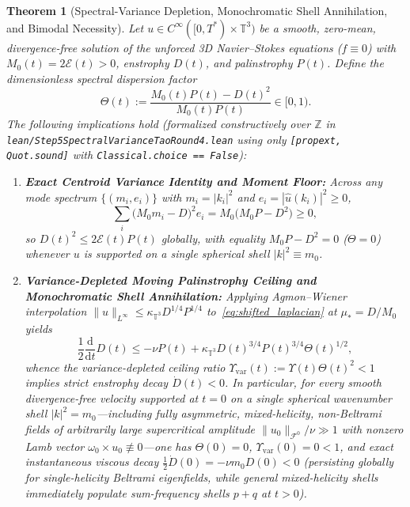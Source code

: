 \documentclass[11pt]{article}
\theoremstyle{plain}
\newtheorem{theorem}{Theorem}[section]
\theoremstyle{definition}
\begin{document}
\begin{theorem}[Spectral-Variance Depletion, Monochromatic Shell Annihilation, and Bimodal Necessity]\label{thm:step5}
Let $u \in C^\infty([0,T^*) \times \mathbb{T}^3)$ be a smooth, zero-mean, divergence-free solution of the unforced 3D Navier--Stokes equations ($f \equiv 0$) with $M_0(t) = 2\mathcal{E}(t) > 0$, enstrophy $D(t)$, and palinstrophy $P(t)$. Define the dimensionless spectral dispersion factor
\begin{equation}\label{eq:theta_var}
  \Theta(t) := \frac{M_0(t) P(t) - D(t)^2}{M_0(t) P(t)} \in [0, 1).
\end{equation}
The following implications hold (formalized constructively over $\mathbb{Z}$ in \texttt{lean/\allowbreak Step5Spectral\allowbreak VarianceTaoRound4.lean} using only \texttt{[propext, Quot.sound]} with \texttt{Classical.choice == False}):
\begin{enumerate}
  \item \textbf{Exact Centroid Variance Identity and Moment Floor:} Across any mode spectrum $\{(m_i, e_i)\}$ with $m_i = |k_i|^2$ and $e_i = |\hat{u}(k_i)|^2 \ge 0$,
  \begin{equation}\label{eq:centroid_variance}
    \sum_{i} \bigl(M_0 m_i - D\bigr)^2 e_i = M_0 \bigl(M_0 P - D^2\bigr) \ge 0,
  \end{equation}
  so $D(t)^2 \le 2\mathcal{E}(t) P(t)$ globally, with equality $M_0 P - D^2 = 0$ ($\Theta = 0$) whenever $u$ is supported on a single spherical shell $|k|^2 \equiv m_0$.
  \item \textbf{Variance-Depleted Moving Palinstrophy Ceiling and Monochromatic Shell Annihilation:} Applying Agmon--Wiener interpolation $\|u\|_{L^\infty} \le \kappa_{\mathbb{T}^3} D^{1/4} P^{1/4}$ to~\eqref{eq:shifted_laplacian} at $\mu_* = D/M_0$ yields
  \begin{equation}\label{eq:variance_ceiling}
    \frac{1}{2}\frac{\mathrm{d}}{\mathrm{d}t} D(t) \le -\nu P(t) + \kappa_{\mathbb{T}^3} D(t)^{3/4} P(t)^{3/4} \Theta(t)^{1/2},
  \end{equation}
  whence the variance-depleted ceiling ratio $\Upsilon_{\mathrm{var}}(t) := \Upsilon(t) \Theta(t)^2 < 1$ implies strict enstrophy decay $\dot{D}(t) < 0$. In particular, for \emph{every} smooth divergence-free velocity supported at $t = 0$ on a single spherical wavenumber shell $|k|^2 = m_0$---including fully asymmetric, mixed-helicity, non-Beltrami fields of arbitrarily large supercritical amplitude $\|u_0\|_{\mathcal{F}^0}/\nu \gg 1$ with nonzero Lamb vector $\omega_0 \times u_0 \not\equiv 0$---one has $\Theta(0) = 0$, $\Upsilon_{\mathrm{var}}(0) = 0 < 1$, and exact instantaneous viscous decay $\frac{1}{2}\dot{D}(0) = -\nu m_0 D(0) < 0$ (persisting globally for single-helicity Beltrami eigenfields, while general mixed-helicity shells immediately populate sum-frequency shells $p + q$ at $t > 0$).

\end{enumerate}
\end{theorem}
\end{document}
